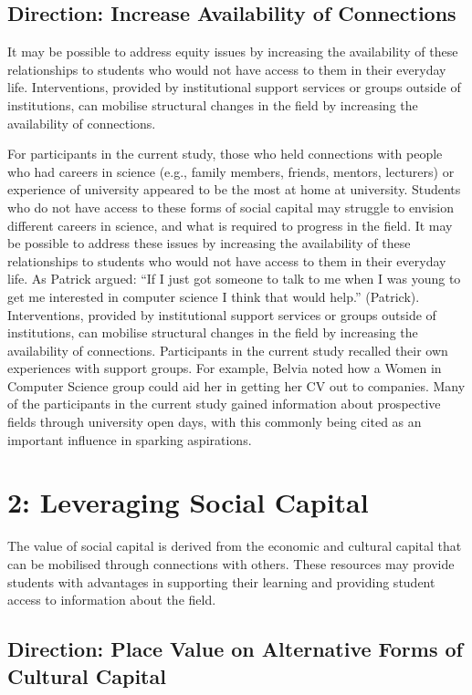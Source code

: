 \subsection{Direction: Increase Availability of Connections}
It may be possible to address equity issues by increasing the availability of these relationships to students who would not have access to them in their everyday life. Interventions, provided by institutional support services or groups outside of institutions, can mobilise structural changes in the field by increasing the availability of connections. 

For participants in the current study, those who held connections with people who had careers in science (e.g., family members, friends, mentors, lecturers) or experience of university appeared to be the most at home at university. Students who do not have access to these forms of social capital may struggle to envision different careers in science, and what is required to progress in the field. It may be possible to address these issues by increasing the availability of these relationships to students who would not have access to them in their everyday life. As Patrick argued: ``If I just got someone to talk to me when I was young to get me interested in computer science I think that would help.'' (Patrick). Interventions, provided by institutional support services or groups outside of institutions, can mobilise structural changes in the field by increasing the availability of connections. Participants in the current study recalled their own experiences with support groups. For example, Belvia noted how a Women in Computer Science group could aid her in getting her CV out to companies. Many of the participants in the current study gained information about prospective fields through university open days, with this commonly being cited as an important influence in sparking aspirations. 

\section{2: Leveraging Social Capital}
The value of social capital is derived from the economic and cultural capital that can be mobilised through connections with others. These resources may provide students with advantages in supporting their learning and providing student access to information about the field. 


\subsection{Direction: Place Value on Alternative Forms of Cultural Capital}


